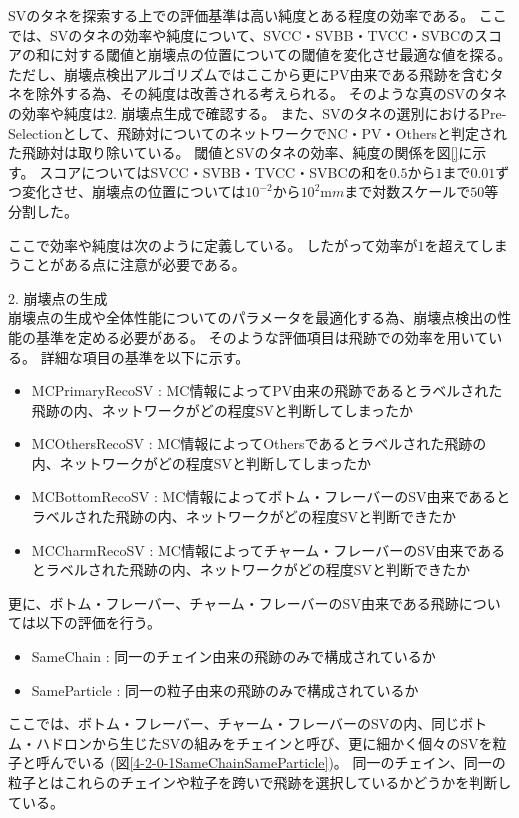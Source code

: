 SVのタネを探索する上での評価基準は高い純度とある程度の効率である。
ここでは、SVのタネの効率や純度について、SVCC・SVBB・TVCC・SVBCのスコアの和に対する閾値と崩壊点の位置についての閾値を変化させ最適な値を探る。
ただし、崩壊点検出アルゴリズムではここから更にPV由来である飛跡を含むタネを除外する為、その純度は改善される考えられる。
そのような真のSVのタネの効率や純度は2. 崩壊点生成で確認する。
また、SVのタネの選別におけるPre-Selectionとして、飛跡対についてのネットワークでNC・PV・Othersと判定された飛跡対は取り除いている。
閾値とSVのタネの効率、純度の関係を図\ref{}に示す。
スコアについてはSVCC・SVBB・TVCC・SVBCの和を$0.5$から$1$まで$0.01$ずつ変化させ、崩壊点の位置については$10^{-2}$から$10^{2} {\mathrm mm}$まで対数スケールで$50$等分割した。

ここで効率や純度は次のように定義している。
したがって効率が$1$を超えてしまうことがある点に注意が必要である。


2. 崩壊点の生成\\

崩壊点の生成や全体性能についてのパラメータを最適化する為、崩壊点検出の性能の基準を定める必要がある。
そのような評価項目は飛跡での効率を用いている。
詳細な項目の基準を以下に示す。

\begin{itemize}
 \item MCPrimaryRecoSV : MC情報によってPV由来の飛跡であるとラベルされた飛跡の内、ネットワークがどの程度SVと判断してしまったか
 \item MCOthersRecoSV : MC情報によってOthersであるとラベルされた飛跡の内、ネットワークがどの程度SVと判断してしまったか
 \item MCBottomRecoSV : MC情報によってボトム・フレーバーのSV由来であるとラベルされた飛跡の内、ネットワークがどの程度SVと判断できたか
 \item MCCharmRecoSV : MC情報によってチャーム・フレーバーのSV由来であるとラベルされた飛跡の内、ネットワークがどの程度SVと判断できたか
\end{itemize}

更に、ボトム・フレーバー、チャーム・フレーバーのSV由来である飛跡については以下の評価を行う。

\begin{itemize}
 \item SameChain : 同一のチェイン由来の飛跡のみで構成されているか
 \item SameParticle : 同一の粒子由来の飛跡のみで構成されているか
\end{itemize}

ここでは、ボトム・フレーバー、チャーム・フレーバーのSVの内、同じボトム・ハドロンから生じたSVの組みをチェインと呼び、更に細かく個々のSVを粒子と呼んでいる (図\ref{4-2-0-1SameChainSameParticle})。
同一のチェイン、同一の粒子とはこれらのチェインや粒子を跨いで飛跡を選択しているかどうかを判断している。

